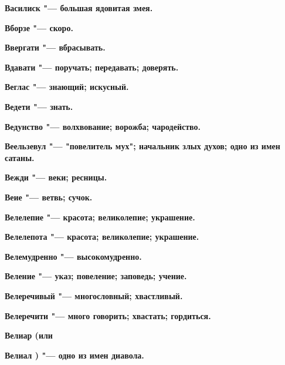 \bfseries Василиск \normalfont{} "--- большая ядовитая змея. 




\bfseries Вборзе \normalfont{} "--- скоро. 




\bfseries Ввергати \normalfont{} "--- вбрасывать. 




\bfseries Вдавати \normalfont{} "--- поручать; передавать; доверять. 




\bfseries Веглас \normalfont{} "--- знающий; искусный. 




\bfseries Ведети \normalfont{} "--- знать. 




\bfseries Ведунство \normalfont{} "--- волхвование; ворожба; чародейство. 




\bfseries Веельзевул \normalfont{} "--- "повелитель мух"; начальник злых духов; одно из имен сатаны. 




\bfseries Вежди \normalfont{} "--- веки; ресницы. 




\bfseries Веие \normalfont{} "--- ветвь; сучок. 




\bfseries Велелепие \normalfont{} "--- красота; великолепие; украшение. 




\bfseries Велелепота \normalfont{} "--- красота; великолепие; украшение. 




\bfseries Велемудренно \normalfont{} "--- высокомудренно. 




\bfseries Веление \normalfont{} "--- указ; повеление; заповедь; учение. 




\bfseries Велеречивый \normalfont{} "--- многословный; хвастливый. 




\bfseries Велеречити \normalfont{} "--- много говорить; хвастать; гордиться. 




\bfseries Велиар \normalfont{} (или 




\bfseries Велиал \normalfont{}) "--- одно из имен диавола. 




